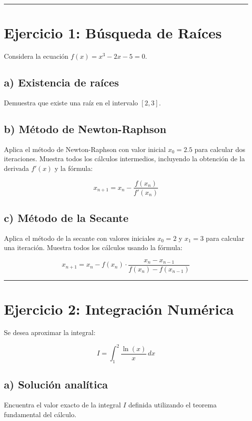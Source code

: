 \documentclass[12pt,a4paper]{article}
\begin{document}
\vspace{0.5cm}
\hrule
\vspace{0.5cm}

\section*{Ejercicio 1: Búsqueda de Raíces}

Considera la ecuación $f(x) = x^3 - 2x - 5 = 0$.

\subsection*{a) Existencia de raíces}
Demuestra que existe una raíz en el intervalo $[2, 3]$.

\subsection*{b) Método de Newton-Raphson}
Aplica el método de Newton-Raphson con valor inicial $x_0 = 2.5$ para calcular dos iteraciones. Muestra todos los cálculos intermedios, incluyendo la obtención de la derivada $f'(x)$ y la fórmula:

$$x_{n+1} = x_n - \frac{f(x_n)}{f'(x_n)}$$

\subsection*{c) Método de la Secante}
Aplica el método de la secante con valores iniciales $x_0 = 2$ y $x_1 = 3$ para calcular una iteración. Muestra todos los cálculos usando la fórmula:

$$x_{n+1} = x_n - f(x_n) \cdot \frac{x_n - x_{n-1}}{f(x_n) - f(x_{n-1})}$$

\vspace{0.5cm}
\hrule
\vspace{0.5cm}

\section*{Ejercicio 2: Integración Numérica}

Se desea aproximar la integral:

$$I = \int_{1}^{2} \frac{\ln(x)}{x} \, dx$$

\subsection*{a) Solución analítica}
Encuentra el valor exacto de la integral $I$ definida utilizando el teorema fundamental del cálculo.
\end{document}
